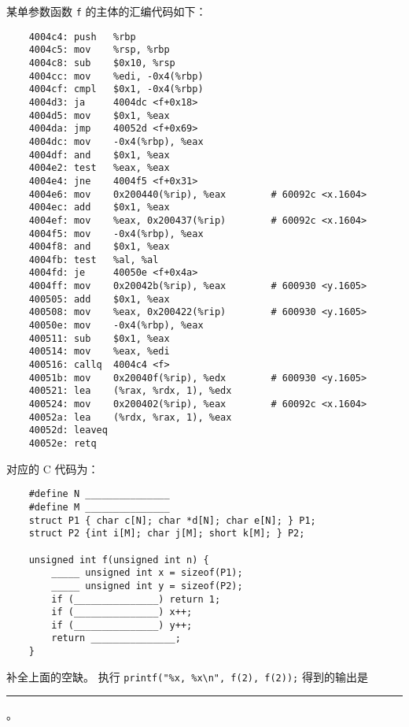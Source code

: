 \begin{problems}
\begin{verbatim}
        \end{verbatim}
         某单参数函数 \verb|f| 的主体的汇编代码如下：
        \begin{verbatim}
    4004c4: push   %rbp
    4004c5: mov    %rsp, %rbp
    4004c8: sub    $0x10, %rsp
    4004cc: mov    %edi, -0x4(%rbp)
    4004cf: cmpl   $0x1, -0x4(%rbp)
    4004d3: ja     4004dc <f+0x18>
    4004d5: mov    $0x1, %eax
    4004da: jmp    40052d <f+0x69>
    4004dc: mov    -0x4(%rbp), %eax
    4004df: and    $0x1, %eax
    4004e2: test   %eax, %eax
    4004e4: jne    4004f5 <f+0x31>
    4004e6: mov    0x200440(%rip), %eax        # 60092c <x.1604>
    4004ec: add    $0x1, %eax
    4004ef: mov    %eax, 0x200437(%rip)        # 60092c <x.1604>
    4004f5: mov    -0x4(%rbp), %eax
    4004f8: and    $0x1, %eax
    4004fb: test   %al, %al
    4004fd: je     40050e <f+0x4a>
    4004ff: mov    0x20042b(%rip), %eax        # 600930 <y.1605>
    400505: add    $0x1, %eax
    400508: mov    %eax, 0x200422(%rip)        # 600930 <y.1605>
    40050e: mov    -0x4(%rbp), %eax
    400511: sub    $0x1, %eax
    400514: mov    %eax, %edi
    400516: callq  4004c4 <f>
    40051b: mov    0x20040f(%rip), %edx        # 600930 <y.1605>
    400521: lea    (%rax, %rdx, 1), %edx
    400524: mov    0x200402(%rip), %eax        # 60092c <x.1604>
    40052a: lea    (%rdx, %rax, 1), %eax
    40052d: leaveq
    40052e: retq
        \end{verbatim}
        对应的 C 代码为：
        \begin{verbatim}
    #define N _______________
    #define M _______________
    struct P1 { char c[N]; char *d[N]; char e[N]; } P1;
    struct P2 {int i[M]; char j[M]; short k[M]; } P2;
 
    unsigned int f(unsigned int n) {
        _____ unsigned int x = sizeof(P1);
        _____ unsigned int y = sizeof(P2);
        if (_______________) return 1;
        if (_______________) x++;
        if (_______________) y++;
        return _______________;
    }
        \end{verbatim}
        \qn 补全上面的空缺。
        \qn 执行 \verb|printf("%x, %x\n", f(2), f(2));| 得到的输出是 \rule{2.5cm}{0.25mm}。
    \end{problems}